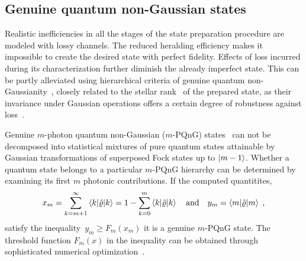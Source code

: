 \documentclass{article}
\begin{document}
%

%
%

\subsection*{Genuine quantum non-Gaussian states}

Realistic inefficiencies in all the stages of the state preparation procedure are modeled with lossy channels. The reduced heralding efficiency makes it impossible to create the desired state with perfect fidelity. Effects of loss incurred during its characterization further diminish the already imperfect state. This can be partly alleviated using hierarchical criteria of genuine quantum non-Gaussianity~\cite{lachman2019}, closely related to the stellar rank~\cite{chabaud2020,walschaers2021,fiurasek2022} of the prepared state, as their invariance under Gaussian operations offers a certain degree of robustness against loss~\cite{lachman2019}.

Genuine $m$-photon quantum non-Gaussian ($m$-PQnG) states~\cite{lachman2019} can not be decomposed into statistical mixtures of pure quantum states attainable by Gaussian transformations of superposed Fock states up to ${\ket{m - 1}}$. Whether a quantum state belongs to a particular $m$-PQnG hierarchy can be determined by examining its first $m$ photonic contributions. 
If the computed quantitites,
%
\begin{equation}
  x_{m} 
    = \sum_{k = m + 1}^{\infty} 
      \braket{k | \hat{\varrho} | k}
    = 1 - \sum_{k = 0}^{m} 
      \braket{k | \hat{\varrho} | k}
  \quad\text{and}\quad
  y_{m} = \braket{m | \hat{\varrho} | m}
  \;\text{,}
\end{equation}
%
satisfy the inequality~${y_{m} \geq F_{m} (x_{m})}$ it is a genuine $m$-PQnG state. The threshold function $F_{m}(x)$ in the inequality can be obtained through sophisticated numerical optimization~\cite{lachman2019,fiurasek2022}.
\end{document}
